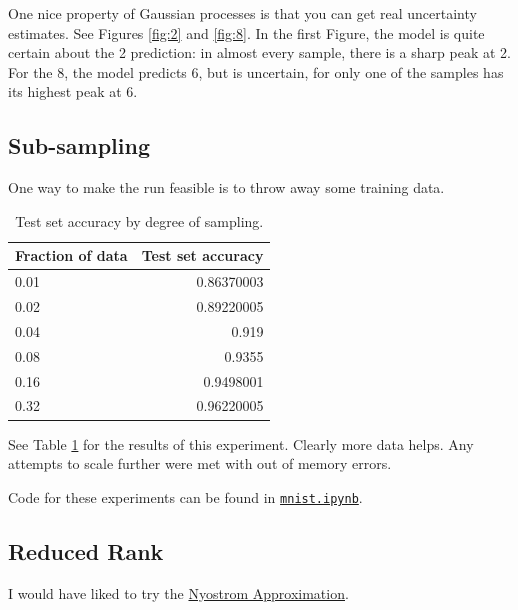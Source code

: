 \documentclass[letterpaper]{article}
\begin{document}
   One nice property of Gaussian processes is that you can get real uncertainty
   estimates. See Figures \ref{fig:2} and \ref{fig:8}. In the first Figure, the
   model is quite certain about the 2 prediction: in almost every sample, there
   is a sharp peak at 2. For the 8, the model predicts 6, but is uncertain, for
   only one of the samples has its highest peak at 6.
   
   \subsection*{Sub-sampling}

   One way to make the run feasible is to throw away some training data.

   \begin{table}
     \centering
     \begin{tabular}{lr}
       \toprule
       Fraction of data & Test set accuracy \\
       \midrule
       0.01 & 0.86370003 \\
       0.02 & 0.89220005 \\
       0.04 & 0.919 \\
       0.08 & 0.9355 \\
       0.16 & 0.9498001 \\
       0.32 & 0.96220005 \\
       \bottomrule
     \end{tabular}
     \caption{Test set accuracy by degree of sampling.}
     \label{tab:test_acc}
   \end{table}

   See Table \ref{tab:test_acc} for the results of this experiment. Clearly more
   data helps. Any attempts to scale further were met with out of memory errors.

   Code for these experiments can be found in
   \href{https://github.com/ppham27/stat527/blob/master/project/mnist.ipynb}{\texttt{mnist.ipynb}}.

   \subsection*{Reduced Rank}

   I would have liked to try the
   \href{https://en.wikipedia.org/wiki/Low-rank_matrix_approximations}{Nyostrom
     Approximation}.

   
\end{document}
